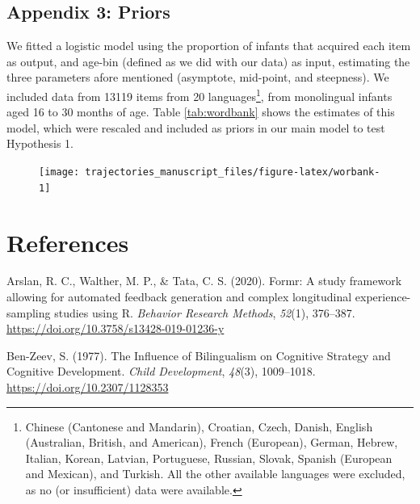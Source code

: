 \documentclass[english,man,man,floatsintext]{apa6}
\begin{document}
\hypertarget{appendix-3-priors}{%
\subsection{Appendix 3: Priors}\label{appendix-3-priors}}

We fitted a logistic model using the proportion of infants that acquired each item as output, and age-bin (defined as we did with our data) as input, estimating the three parameters afore mentioned (asymptote, mid-point, and steepness). We included data from 13119 items from 20 languages\footnote{Chinese (Cantonese and Mandarin), Croatian, Czech, Danish, English (Australian, British, and American), French (European), German, Hebrew, Italian, Korean, Latvian, Portuguese, Russian, Slovak, Spanish (European and Mexican), and Turkish. All the other available languages were excluded, as no (or insufficient) data were available.}, from monolingual infants aged 16 to 30 months of age. Table \ref{tab:wordbank} shows the estimates of this model, which were rescaled and included as priors in our main model to test Hypothesis 1.

\begin{figure}

{\centering \texttt{[image: trajectories\_manuscript\_files/figure-latex/worbank-1]} 

}

\caption{ }\label{fig:worbank}
\end{figure}

\hypertarget{references}{%
\section{References}\label{references}}

\begingroup
\setlength{\parindent}{-0.5in}
\setlength{\leftskip}{0.5in}

\hypertarget{refs}{}
\leavevmode\hypertarget{ref-arslan2020}{}%
Arslan, R. C., Walther, M. P., \& Tata, C. S. (2020). Formr: A study framework allowing for automated feedback generation and complex longitudinal experience-sampling studies using R. \emph{Behavior Research Methods}, \emph{52}(1), 376--387. \url{https://doi.org/10.3758/s13428-019-01236-y}

\leavevmode\hypertarget{ref-ben-zeev1977}{}%
Ben-Zeev, S. (1977). The Influence of Bilingualism on Cognitive Strategy and Cognitive Development. \emph{Child Development}, \emph{48}(3), 1009--1018. \url{https://doi.org/10.2307/1128353}
\end{document}
